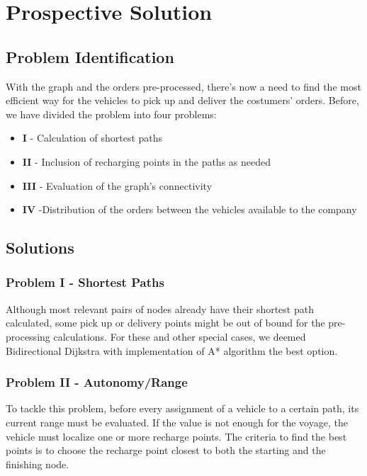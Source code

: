\chapter{Prospective Solution}




\section{Problem Identification}

With the graph and the orders pre-processed, there's now a need to find the most efficient way for the vehicles to pick up and deliver the costumers' orders. Before, we have divided the problem into four problems:
\begin{itemize}
    \item \textbf{I} - Calculation of shortest paths
    \item \textbf{II} - Inclusion of recharging points in the paths as needed
    \item \textbf{III} - Evaluation of the graph's connectivity
    \item \textbf{IV} -Distribution of the orders between the vehicles available to the company
\end{itemize}


\section{Solutions}

\subsection{Problem I - Shortest Paths}
Although most relevant pairs of nodes already have their shortest path calculated, some pick up or delivery points might be out of bound for the pre-processing calculations. For these and other special cases, we deemed Bidirectional Dijkstra with implementation of A* algorithm the best option.


\subsection{Problem II - Autonomy/Range}
To tackle this problem, before every assignment of a vehicle to a certain path, its current range must be evaluated. If the value is not enough for the voyage, the vehicle must localize one or more recharge points. The criteria to find the best points is to choose the recharge point closest to both the starting and the finishing node. 

